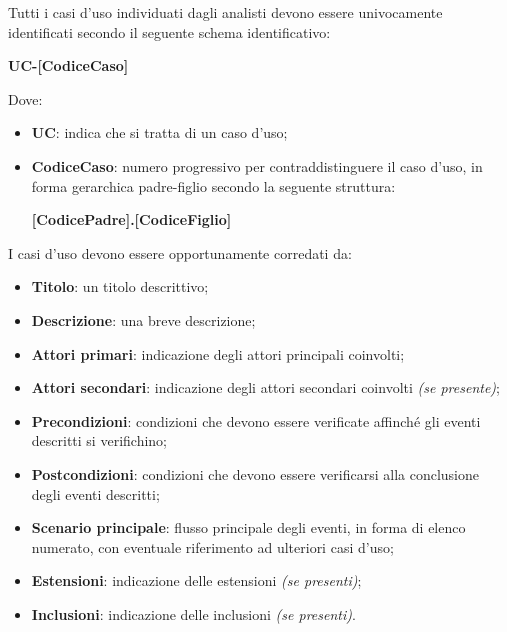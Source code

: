 Tutti i casi d'uso individuati dagli analisti devono essere univocamente identificati secondo il seguente schema identificativo:

\begin{center}
    \textbf{UC-[CodiceCaso]}
\end{center}

Dove:

\begin{itemize}
    \item \textbf{UC}: indica che si tratta di un caso d'uso;
    \item \textbf{CodiceCaso}: numero progressivo per contraddistinguere il caso d'uso, in forma gerarchica padre-figlio secondo la seguente struttura:
    \begin{center}
        \textbf{[CodicePadre].[CodiceFiglio]}
    \end{center}
\end{itemize}

I casi d'uso devono essere opportunamente corredati da:

\begin{itemize}
    \item \textbf{Titolo}: un titolo descrittivo;
    \item \textbf{Descrizione}: una breve descrizione;
    \item \textbf{Attori primari}: indicazione degli attori principali coinvolti;
    \item \textbf{Attori secondari}: indicazione degli attori secondari coinvolti \emph{(se presente)};
    \item \textbf{Precondizioni}: condizioni che devono essere verificate affinch\'{e} gli eventi descritti si verifichino;
    \item \textbf{Postcondizioni}: condizioni che devono essere verificarsi alla conclusione degli eventi descritti; 
    \item \textbf{Scenario principale}: flusso principale degli eventi, in forma di elenco numerato, con eventuale riferimento ad ulteriori casi d'uso;
    \item \textbf{Estensioni}: indicazione delle estensioni \emph{(se presenti)};
    \item \textbf{Inclusioni}: indicazione delle inclusioni \emph{(se presenti)}.
\end{itemize}